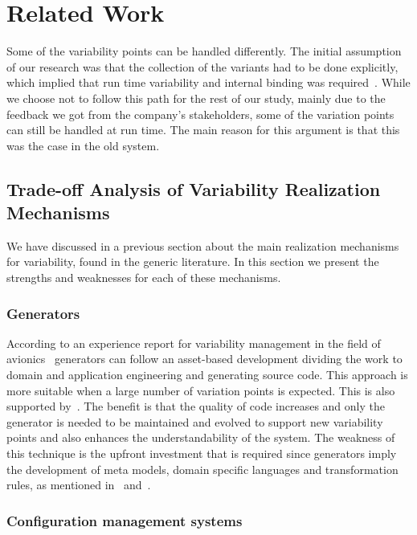 \section{Related Work}\label{sec:relatedWorks}

Some of the variability points can be handled differently. The initial assumption of our research was that the collection of the variants had to be done explicitly, which implied that run time variability and internal binding was required~\cite{JillesVanGurp2001}. %
While we choose not to follow this path for the rest of our study, mainly due to the feedback we got from the company's stakeholders, some of the variation points can still be handled at run time. The main reason for this argument is that this was the case in the old system. 


\subsection{Trade-off Analysis of Variability Realization Mechanisms}

We have discussed in a previous section about the main realization mechanisms for variability, found in the generic literature. In this section we present the strengths and weaknesses for each of these mechanisms.

\subsubsection{Generators}
According to an experience report for variability management in the field of avionics~\cite{Wolfl2015} generators can follow an asset-based development dividing the work to domain and application engineering and generating source code. This approach is more suitable when a large number of variation points is expected. This is also supported by~\cite{Bachmann2001}. %
The benefit is that the quality of code increases and only the generator is needed to be maintained and evolved to support new variability points and also enhances the understandability of the system. The weakness of this technique is the upfront investment that is required since generators imply the development of meta models, domain specific languages and transformation rules, as mentioned in~\cite{Wolfl2015} and~\cite{Bachmann2001}. %

\subsubsection{Configuration management systems}

